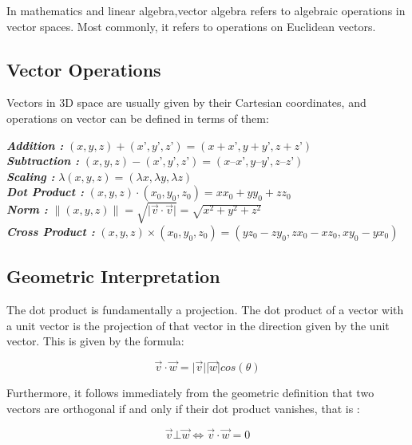 \documentclass[12pt]{report}
\begin{document}
\hspace{1cm} In mathematics and linear algebra,vector algebra refers to algebraic operations in vector spaces. Most commonly, it refers to operations on Euclidean vectors.

\subsection{Vector Operations}

Vectors in 3D space are usually given by their Cartesian coordinates, and operations on vector can be defined in terms of them:

\indent \textbf{\textit{Addition : }} $ (x, y, z) + (x’ , y’ ,z’) = (x + x’, y + y’, z + z’) $  \\
\indent \textbf{\textit{Subtraction : }} $(x, y, z) − (x’ , y’ ,z’) = (x – x’ ,y – y’, z – z’)$ \\
\indent \textbf{\textit{Scaling : }} $ \lambda (x, y, z) = (\lambda x, \lambda y, \lambda z)  $ \\
\indent \textbf{\textit{Dot Product : }}$ (x, y, z) \cdot (x_{0} , y_{0} ,z_{0} ) = x x_{0} + y y_{0} + z z_{0} $ \\
\indent \textbf{\textit{Norm : }} $ \| ( x , y , z ) \| = \sqrt{\vert \overrightarrow{v} \cdot \overrightarrow{v} \vert } = \sqrt{x^2 + y^2 + z^2} $ \\
\indent \textbf{\textit{Cross Product : }} $ (x, y, z ) \times (x_{0} , y_{0} ,z_{0} ) = (y z_{0} − z y_{0} ,z x_{0} − x z_{0} , x y_{0} − y x_{0} ) $ \\

\subsection{Geometric Interpretation}

The dot product is fundamentally a projection. The dot product of a vector with a unit vector is the projection of that vector in the direction given by the unit vector. This is given by the formula:

\[ \overrightarrow{v} \cdot \overrightarrow{w} = \vert \overrightarrow{v} \vert \vert \overrightarrow{w} \vert  cos (\theta) \]


Furthermore, it follows immediately from the geometric definition that two vectors are orthogonal if and only if their dot product vanishes, that is : 

\[ \overrightarrow{v} \bot \overrightarrow{w} \Leftrightarrow \overrightarrow{v} \cdot \overrightarrow{w} = 0 \]
\end{document}
